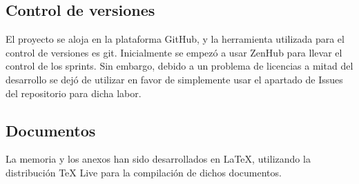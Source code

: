 \subsection{Control de versiones}

El proyecto se aloja en la plataforma GitHub, y la herramienta utilizada para el control de versiones es git.
Inicialmente se empezó a usar ZenHub para llevar el control de los sprints. Sin embargo, debido a un problema de 
licencias a mitad del desarrollo se dejó de utilizar en favor de simplemente usar el apartado de Issues del repositorio 
para dicha labor.

\subsection{Documentos}

La memoria y los anexos han sido desarrollados en LaTeX, utilizando la distribución TeX Live\cite{texlive} para la
compilación de dichos documentos.